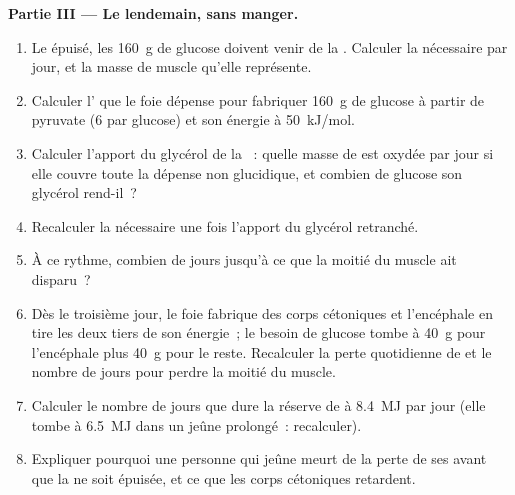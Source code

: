 \begin{problem}
\medskip
\noindent\textbf{Partie III --- Le lendemain, sans manger.}
\begin{enumerate}[resume]
  \item Le  épuisé, les \qty{160}{g} de glucose doivent venir
        de la . Calculer la  nécessaire par jour,
        et la masse de muscle qu'elle représente.
  \item Calculer l' que le foie dépense pour fabriquer \qty{160}{g}
        de glucose à partir de pyruvate (6  par glucose) et son
        énergie à \qty{50}{kJ/mol}.
  \item Calculer l'apport du glycérol de la ~: quelle masse de
         est oxydée par jour si elle couvre toute la dépense non
        glucidique, et combien de glucose son glycérol rend-il~?
  \item Recalculer la  nécessaire une fois l'apport du glycérol
        retranché.
  \item À ce rythme, combien de jours jusqu'à ce que la moitié du muscle
        ait disparu~?
  \item Dès le troisième jour, le foie fabrique des corps cétoniques et
        l'encéphale en tire les deux tiers de son énergie~; le besoin de
        glucose tombe à \qty{40}{g} pour l'encéphale plus \qty{40}{g}
        pour le reste. Recalculer la perte quotidienne de  et
        le nombre de jours pour perdre la moitié du muscle.
  \item Calculer le nombre de jours que dure la réserve de  à
        \qty{8.4}{MJ} par jour (elle tombe à \qty{6.5}{MJ} dans un jeûne
        prolongé~: recalculer).
  \item Expliquer pourquoi une personne qui jeûne meurt de la perte de
        ses  avant que la  ne soit épuisée, et ce que
        les corps cétoniques retardent.
\end{enumerate}


\end{problem}

